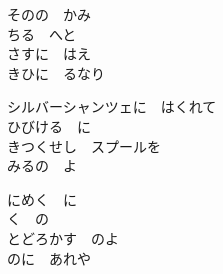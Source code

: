 \documentclass[10pt,b5j]{tarticle} %
\begin{document}
\begin{enumerate}
\begin{minipage}[c]{\blocksize}
        \vspace{\linespace}
        \item
        そのの　かみ\\
        ちる　へと\\
        さすに　はえ\\
        きひに　るなり
        
        \vspace{\linespace}
        \item
        シルバーシャンツェに　はくれて\\
        ひびける　に\\
        きつくせし　スプールを\\
        みるの　よ
        
        \vspace{\linespace}
        \item
        にめく　に\\
        く　の\\
        とどろかす　のよ\\
        のに　あれや
    
    \end{minipage}
\end{enumerate} %
\end{document}
